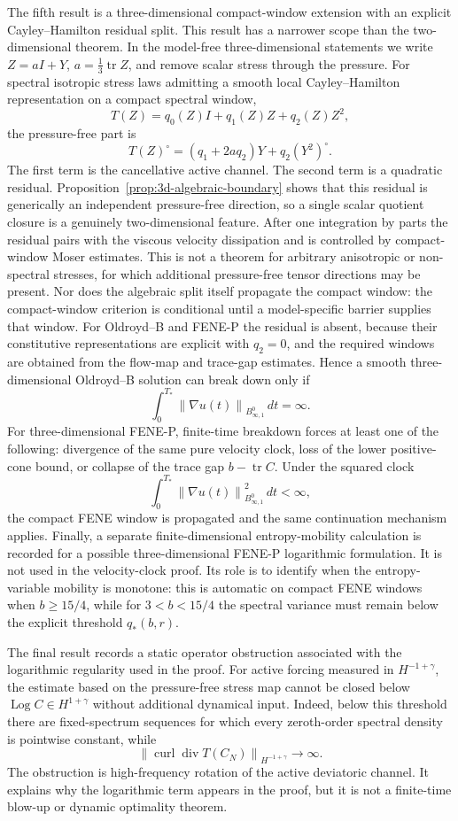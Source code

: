 \documentclass[11pt]{article}
\newcommand{\tr}{\operatorname{tr}}
\newcommand{\divv}{\operatorname{div}}
\newcommand{\curl}{\operatorname{curl}}
\newcommand{\Log}{\operatorname{Log}}
\newcommand{\norm}[1]{\left\lVert #1\right\rVert}
\newcommand{\Besov}{B^0_{\infty,1}}
\begin{document}
The fifth result is a three-dimensional compact-window extension with an
explicit Cayley--Hamilton residual split.  This result has a narrower scope than
the two-dimensional theorem.  In the model-free three-dimensional statements we
write \(Z=aI+Y\), \(a=\frac13\tr Z\), and remove scalar stress through the
pressure.  For spectral isotropic stress laws admitting a smooth local
Cayley--Hamilton representation on a compact spectral window,
\[
  T(Z)=q_0(Z)I+q_1(Z)Z+q_2(Z)Z^2,
\]
the pressure-free part is
\[
  T(Z)^\circ=(q_1+2aq_2)Y+q_2(Y^2)^\circ .
\]
The first term is the cancellative active channel.  The second term is a
quadratic residual.  Proposition~\ref{prop:3d-algebraic-boundary} shows that
this residual is generically an independent pressure-free direction, so a single
scalar quotient closure is a genuinely two-dimensional feature.  After one
integration by parts the residual pairs with the viscous velocity dissipation
and is controlled by compact-window Moser estimates.  This is not a theorem for
arbitrary anisotropic or non-spectral stresses, for which additional
pressure-free tensor directions may be present.  Nor does the algebraic split
itself propagate the compact window: the compact-window criterion is conditional
until a model-specific barrier supplies that window.
For Oldroyd--B and FENE-P the residual is absent, because their constitutive
representations are explicit with \(q_2=0\), and the required windows are
obtained from the flow-map and trace-gap estimates.  Hence a smooth
three-dimensional Oldroyd--B solution can break down only if
\[
  \int_0^{T_*}\norm{\nabla u(t)}_{\Besov}\,dt=\infty .
\]
For three-dimensional FENE-P, finite-time breakdown forces at least one of the
following: divergence of the same pure velocity clock, loss of the lower
positive-cone bound, or collapse of the trace gap \(b-\tr C\).  Under the
squared clock
\[
  \int_0^{T_*}\norm{\nabla u(t)}_{\Besov}^2\,dt<\infty,
\]
the compact FENE window is propagated and the same continuation mechanism
applies.
Finally, a separate finite-dimensional entropy-mobility calculation is recorded
for a possible three-dimensional FENE-P logarithmic formulation.  It is not used
in the velocity-clock proof.  Its role is to identify when the entropy-variable
mobility is monotone: this is automatic on compact FENE windows when
\(b\ge15/4\), while for \(3<b<15/4\) the spectral variance must remain below the
explicit threshold \(q_*(b,r)\).

The final result records a static operator obstruction associated with the
logarithmic regularity used in the proof.  For active forcing measured in
\(H^{-1+\gamma}\), the estimate based on the pressure-free stress map cannot be
closed below \(\Log C\in H^{1+\gamma}\) without additional dynamical input.
Indeed, below this threshold there are fixed-spectrum sequences for which every
zeroth-order spectral density is pointwise constant, while
\[
  \norm{\curl\divv T(C_N)}_{H^{-1+\gamma}}\to\infty .
\]
The obstruction is high-frequency rotation of the active deviatoric channel.
It explains why the logarithmic term appears in the proof, but it is not a
finite-time blow-up or dynamic optimality theorem.
\end{document}
